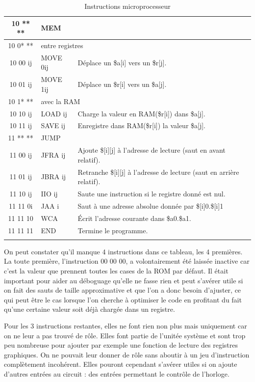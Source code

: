 \documentclass{article}
\begin{document}
\begin{savenotes}
\begin{longtable}{|c|l|l|}
  \hline\hline
  10 ** ** & \multicolumn{2}{|l|}{MEM} \\
  \hline
  \hline
  10 0* ** & \multicolumn{2}{|l|}{entre registres} \\
  \hline
  10 00 ij & MOVE 0ij & Déplace un \$a[i] vers un \$r[j]. \\
  10 01 ij & MOVE 1ij & Déplace un \$r[i] vers un \$a[j]. \\
  \hline
  10 1* ** & \multicolumn{2}{|l|}{avec la RAM} \\
  \hline
  10 10 ij & LOAD ij  & Charge la valeur en RAM(\$r[i]) dans \$a[j]. \\
  10 11 ij & SAVE ij  & Enregistre dans RAM(\$r[i]) la valeur \$a[j]. \\

  \hline\hline
  11 ** ** & \multicolumn{2}{|l|}{JUMP} \\
  \hline
  11 00 ij & JFRA ij & Ajoute \$[i][j] à l'adresse de lecture (saut en avant relatif). \\
  11 01 ij & JBRA ij & Retranche \$[i][j] à l'adresse de lecture (saut en arrière relatif). \\
  11 10 ij & IIO  ij & Saute une instruction si le registre donné est nul. \\
  11 11 0i & JAA  i  & Saut à une adresse absolue donnée par \$[i]0.\$[i]1\\
  11 11 10 & WCA     & \'Ecrit l'adresse courante dans \$a0.\$a1. \\
  11 11 11 & END      & Termine le programme. \\
  \hline

\caption{Instructions microprocesseur}
\end{longtable}
\end{savenotes}

On peut constater qu'il manque 4 instructions dans ce tableau, les 4 premières.
La toute première, l'instruction 00 00 00, a volontairement été laissée inactive
car c'est la valeur que prennent toutes les cases de la ROM par défaut. Il était
important pour aider au déboguage qu'elle ne fasse rien et peut s'avérer utile
si on fait des sauts de taille approximative et que l'on a donc besoin d'ajuster,
ce qui peut être le cas lorsque l'on cherche à optimiser le code en profitant du
fait qu'une certaine valeur soit déjà chargée dans un registre.

Pour les 3 instructions restantes, elles ne font rien non plus mais uniquement car
on ne leur a pas trouvé de rôle. Elles font partie de l'unitée système et sont trop
peu nombreuse pour ajouter par exemple une fonction de lecture des registres graphiques.
On ne pouvait leur donner de rôle sans aboutir à un jeu d'instruction complètement
incohérent. Elles pouront cependant s'avérer utiles si on ajoute d'autres entrées
au circuit : des entrées permettant le contrôle de l'horloge.
\end{document}
